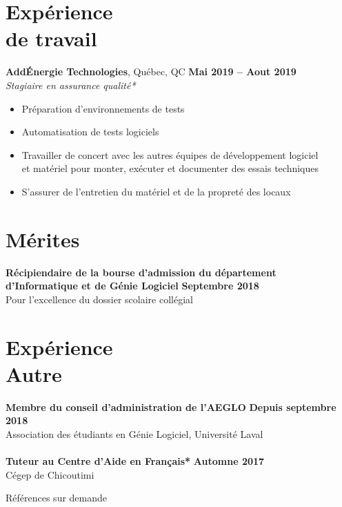 \documentclass[margin,line]{resume}
\begin{document}
\begin{resume}
    \section{\mysidestyle Expérience\\de travail}
    \textbf{AddÉnergie Technologies}, Québec, QC \hfill \textbf{Mai 2019 -- Aout 2019} \vspace{2mm}\\\vspace{1mm}%
    \textsl{Stagiaire en assurance qualité*}
    \begin{itemize}[nosep]
        \item Préparation d'environnements de tests
        \item Automatisation de tests logiciels
        \item Travailler de concert avec les autres équipes de développement logiciel
        \\    et matériel pour monter, exécuter et documenter des essais techniques
        \item S'assurer de l'entretien du matériel et de la propreté des locaux
    \end{itemize}


    \section{\mysidestyle Mérites} 
     \textbf{Récipiendaire de la bourse d'admission du département
     \\      d'Informatique et de Génie Logiciel} \hfill \textbf{Septembre 2018}
     \vspace{2mm}\\\vspace{1mm}
        Pour l'excellence du dossier scolaire collégial
        
    \section{\mysidestyle Expérience\\Autre}
     \textbf{Membre du conseil d'administration de l'AEGLO} \hfill \textbf{Depuis septembre 2018} \vspace{2mm}\\\vspace{1mm}
    Association des étudiants en Génie Logiciel, Université Laval \\ \\
   \textbf{Tuteur au Centre d'Aide en Français*} \hfill \textbf{Automne 2017} \vspace{2mm}\\\vspace{1mm}%
    Cégep de Chicoutimi \\
    
    

\end{resume}

\name{}
\begin{resume}
\hfill *Références sur demande
\end{resume}
\end{document}

